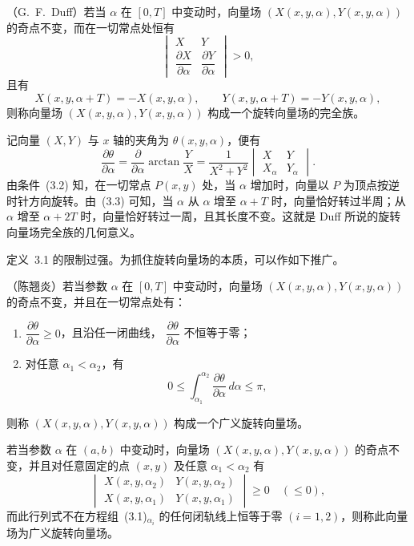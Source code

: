 \begin{definition}{}{}
（G.~F.~Duff）若当 $\alpha$ 在 $[0,T]$ 中变动时，向量场
$(X(x,y,\alpha),Y(x,y,\alpha))$ 的奇点不变，而在一切常点处恒有
\[
 \begin{vmatrix}
 X&Y\\[2pt]
 \dfrac{\partial X}{\partial\alpha}&\dfrac{\partial Y}{\partial\alpha}
 \end{vmatrix}>0, \tag{3.2}
\]
且有
\[
 X(x,y,\alpha+T)=-X(x,y,\alpha),\qquad
 Y(x,y,\alpha+T)=-Y(x,y,\alpha), \tag{3.3}
\]
则称向量场 $(X(x,y,\alpha),Y(x,y,\alpha))$ 构成一个旋转向量场的完全族。
\end{definition}

记向量 $(X,Y)$ 与 $x$ 轴的夹角为 $\theta(x,y,\alpha)$，便有
\[
 \dfrac{\partial\theta}{\partial\alpha}
 =\dfrac{\partial}{\partial\alpha}\arctan\dfrac{Y}{X}
 =\dfrac{1}{X^2+Y^2}
 \begin{vmatrix}
 X&Y\\[2pt] X_\alpha&Y_\alpha
 \end{vmatrix}. \tag{3.4}
\]
由条件~(3.2) 知，在一切常点 $P(x,y)$ 处，当 $\alpha$ 增加时，向量以 $P$ 为顶点按逆时针方向旋转。由~(3.3) 可知，当 $\alpha$ 从 $\alpha$ 增至 $\alpha+T$ 时，向量恰好转过半周；从 $\alpha$ 增至 $\alpha+2T$ 时，向量恰好转过一周，且其长度不变。这就是 Duff 所说的旋转向量场完全族的几何意义。

定义~3.1 的限制过强。为抓住旋转向量场的本质，可以作如下推广。

\begin{definition}{}{}
（陈翘炎）若当参数 $\alpha$ 在 $[0,T]$ 中变动时，向量场
$(X(x,y,\alpha),Y(x,y,\alpha))$ 的奇点不变，并且在一切常点处有：

\begin{enumerate}
\item $\dfrac{\partial\theta}{\partial\alpha}\geq0$，且沿任一闭曲线，
$\dfrac{\partial\theta}{\partial\alpha}$ 不恒等于零；
\item 对任意 $\alpha_1<\alpha_2$，有
\[
 0\leq\int_{\alpha_1}^{\alpha_2}
 \dfrac{\partial\theta}{\partial\alpha}\,d\alpha\leq\pi,
\]
\end{enumerate}
则称 $(X(x,y,\alpha),Y(x,y,\alpha))$ 构成一个广义旋转向量场。
\end{definition}

\begin{definition}{}{}
若当参数 $\alpha$ 在 $(a,b)$ 中变动时，向量场
$(X(x,y,\alpha),Y(x,y,\alpha))$ 的奇点不变，并且对任意固定的点 $(x,y)$ 及任意 $\alpha_1<\alpha_2$ 有
\[
 \begin{vmatrix}
 X(x,y,\alpha_2)&Y(x,y,\alpha_2)\\
 X(x,y,\alpha_1)&Y(x,y,\alpha_1)
 \end{vmatrix}\geq0\quad(\leq0), \tag{3.5}
\]
而此行列式不在方程组~(3.1)$_{\alpha_i}$ 的任何闭轨线上恒等于零
$(i=1,2)$，则称此向量场为广义旋转向量场。
\end{definition}


